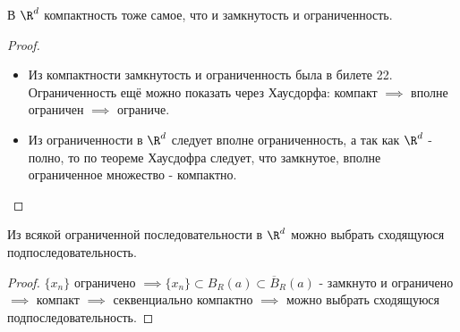 \begin{theorem} \thmslashn

  В $\R^d$ компактность тоже самое, что и замкнутость и ограниченность.
  \begin{proof} \thmslashn

    \begin{itemize}
      \item Из компактности замкнутость и ограниченность была в билете 22. Ограниченность ещё можно показать через Хаусдорфа: компакт $\implies$ вполне ограничен $\implies$ ограниче.
      \item Из ограниченности в $\R^d$ следует вполне ограниченность, а так как $\R^d$ - полно, то по теореме Хаусдофра следует, что замкнутое, вполне ограниченное множество -  компактно. 
    \end{itemize}
  \end{proof}
\end{theorem}

\begin{theorem} \thmslashn

    Из всякой ограниченной последовательности в $\R^{d}$ можно выбрать сходящуюся подпоследовательность.
    \begin{proof} \thmslashn
    
        $\{x_{n}\}$ ограничено $\implies \{x_{n}\} \subset B_{R}(a) \subset \overline{B}_{R}(a) $ - замкнуто и ограничено $\implies$ компакт $\implies$ секвенциально компактно $\implies$ можно выбрать сходящуюся подпоследовательность.
    \end{proof}
\end{theorem}


